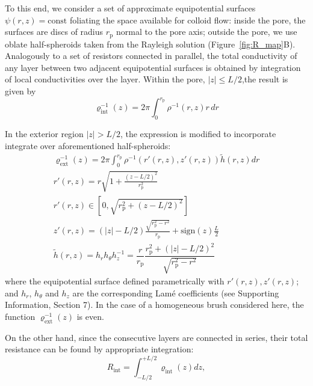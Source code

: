 \documentclass[12pt, a4paper]{article}
\begin{document}
To this end, we consider a set of approximate equipotential surfaces $\psi(r,z)=\text{const}$ foliating the space available for colloid flow: inside the pore, the surfaces are discs of radius $r_{\text{p}}$ normal to the pore axis; outside the pore, we use oblate half-spheroids taken from the Rayleigh solution \cite{Strutt1878} (Figure~\ref{fig:R_map}B).
Analogously to a set of resistors connected in parallel, the total conductivity of any layer between two adjacent equipotential surfaces is obtained by integration of local conductivities over the layer. Within the pore, $|z|\leq L/2$,the result is given by
\begin{equation}
\varrho_{\text{int}}^{-1}(z)= 2\pi\int_{0}^{r_{\text{p}}^{}} \rho^{-1}(r,z) r \, dr
\label{eq:varrho1}
\end{equation}

In the exterior region $|z| >L/2$, the expression is modified to incorporate integrate over aforementioned half-spheroids:
\begin{equation}
    \begin{gathered}
        \varrho_{\text{ext}}^{-1}(z)= 2\pi\int_{0}^{r_{\text{p}}^{}} \rho^{-1}\left( r'(r,z), z'(r,z) \right)  \tilde{h} (r,z) dr\\
        r'(r,z) = r\sqrt{1 + \frac{(z - L/2)^2}{r_{\text{p}}^2}}\\
        r'(r,z) \in [0, \sqrt{r_{\text{p}}^2 + (z-L/2)^2}]\\
        z'(r,z) = (|z| - L/2) \frac{\sqrt{r_{\text{p}}^2 - r^2}}{r_{\text{p}}} +  \text{sign}(z) \frac{L}{2}\\
        \tilde{h} (r,z) = h_r h_{\theta} h_z^{-1} = \dfrac{r}{r_{\text{p}}}\dfrac{r_{\text{p}}^2 + (|z|-L/2)^2}{\sqrt{r_{\text{p}}^2 - r^2}}
    \end{gathered}
\label{eq:varrho2}
\end{equation}
where the equipotential surface defined parametrically with $r'(r,z) , z'(r,z)$; and $h_r$, $h_{\theta}$ and $h_z$ are the corresponding Lam\'e coefficients (see Supporting Information, Section 7). In the case of a homogeneous brush considered here, the function $\varrho_{\text{ext}}^{-1}(z)$ is even.%

On the other hand, since the consecutive layers are connected in series, their total resistance can be found by appropriate integration:
\begin{equation}
    R_{\text{int}} = \int_{-L/2}^{+L/2}\varrho_{\text{int}}(z) dz,
    \label{R_int}
\end{equation}
\end{document}
